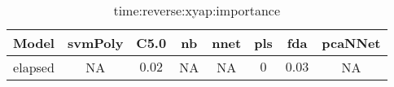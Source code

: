 \begin{table}[!ht]
	\centering
	\begin{tabular}{|c|c|c|c|c|c|c|c|}
		\hline
		Model & svmPoly & C5.0 & nb & nnet & pls & fda & pcaNNet \\ \hline
		elapsed & NA & $0.02$ & NA & NA & $0$ & $0.03$ & NA \\ \hline
	\end{tabular}
	\caption{time:reverse:xyap:importance}
	\label{tab:time:reverse:xyap:importance}
\end{table}
